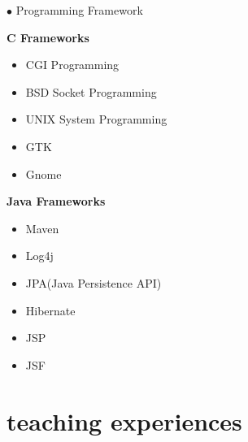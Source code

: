 \documentclass[]{friggeri-cv} %
\begin{document}
\begin{entrylist}
	\entry
	{\textcolor{UniBlue}{$\bullet$}}
	{Programming Framework}
	{}
	{
		\textbf{C Frameworks}
		\begin{itemize}
			\item CGI Programming
			\item BSD Socket Programming
			\item UNIX System Programming
			\item GTK
			\item Gnome
		\end{itemize}
	
		\textbf{Java Frameworks}
		\begin{itemize}
			\item Maven
			\item Log4j
			\item JPA(Java Persistence API)
			\item Hibernate
			\item JSP
			\item JSF
		\end{itemize}
	}



\end{entrylist}


\section{teaching experiences}
\end{document}

